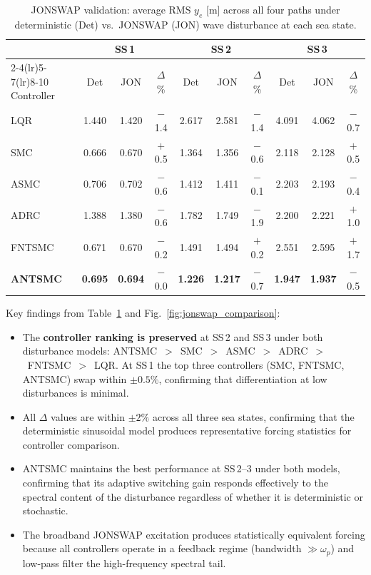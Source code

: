 \documentclass[review]{cas-dc}
\begin{document}
\begin{table}[t]
\centering
\caption{JONSWAP validation: average RMS $y_e$ [m] across all four paths under deterministic (Det) vs.\ JONSWAP (JON) wave disturbance at each sea state.}
\label{tab:jonswap}
\begin{tabular}{l ccc ccc ccc}
\toprule
 & \multicolumn{3}{c}{SS\,1} & \multicolumn{3}{c}{SS\,2} & \multicolumn{3}{c}{SS\,3} \\
\cmidrule(lr){2-4}\cmidrule(lr){5-7}\cmidrule(lr){8-10}
Controller & Det & JON & $\Delta$\% & Det & JON & $\Delta$\% & Det & JON & $\Delta$\% \\
\midrule
LQR    & 1.440 & 1.420 & $-$1.4 & 2.617 & 2.581 & $-$1.4 & 4.091 & 4.062 & $-$0.7 \\
SMC    & 0.666 & 0.670 & $+$0.5 & 1.364 & 1.356 & $-$0.6 & 2.118 & 2.128 & $+$0.5 \\
ASMC   & 0.706 & 0.702 & $-$0.6 & 1.412 & 1.411 & $-$0.1 & 2.203 & 2.193 & $-$0.4 \\
ADRC   & 1.388 & 1.380 & $-$0.6 & 1.782 & 1.749 & $-$1.9 & 2.200 & 2.221 & $+$1.0 \\
FNTSMC & 0.671 & 0.670 & $-$0.2 & 1.491 & 1.494 & $+$0.2 & 2.551 & 2.595 & $+$1.7 \\
\textbf{ANTSMC} & \textbf{0.695} & \textbf{0.694} & $-$0.0 & \textbf{1.226} & \textbf{1.217} & $-$0.7 & \textbf{1.947} & \textbf{1.937} & $-$0.5 \\
\bottomrule
\end{tabular}
\end{table}

Key findings from Table~\ref{tab:jonswap} and Fig.~\ref{fig:jonswap_comparison}:
\begin{itemize}
  \item The \textbf{controller ranking is preserved} at SS\,2 and SS\,3 under both disturbance models: ANTSMC~$>$~SMC~$>$~ASMC~$>$~ADRC~$>$~FNTSMC~$>$~LQR. At SS\,1 the top three controllers (SMC, FNTSMC, ANTSMC) swap within $\pm 0.5\%$, confirming that differentiation at low disturbances is minimal.
  \item All $\Delta$ values are within $\pm 2\%$ across all three sea states, confirming that the deterministic sinusoidal model produces representative forcing statistics for controller comparison.
  \item ANTSMC maintains the best performance at SS\,2--3 under both models, confirming that its adaptive switching gain responds effectively to the spectral content of the disturbance regardless of whether it is deterministic or stochastic.
  \item The broadband JONSWAP excitation produces statistically equivalent forcing because all controllers operate in a feedback regime (bandwidth $\gg \omega_p$) and low-pass filter the high-frequency spectral tail.
\end{itemize}
\end{document}
